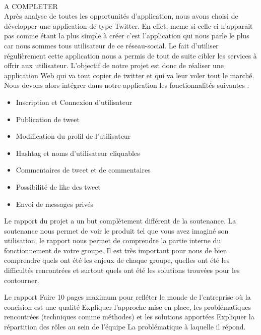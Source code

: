 \documentclass[a4paper, 12pt]{article}
\begin{document}
	\paragraph{}
	\large{A COMPLETER}\\
	    Après analyse de toutes les opportunités d'application, nous avons choisi de développer une application de type Twitter. En effet, meme si celle-ci n'apparait pas comme étant la plus simple à créer c'est l'application qui nous parle le plus car nous sommes tous utilisateur de ce réseau-social.
	    Le fait d'utiliser régulièrement cette application nous a permis de tout de suite cibler les services à offrir aux utilisateur.
		L'objectif de notre projet est donc de réaliser une application Web qui va tout copier de twitter et qui va leur voler tout le marché. Nous devons alors intégrer dans notre application les fonctionnalités suivantes : 
\begin{itemize}
\item Inscription et Connexion d'utilisateur
\item Publication de tweet 
\item Modification du profil de l'utilisateur
\item Hashtag et noms d'utilisateur cliquables
\item Commentaires de tweet et de commentaires
\item Possibilité de like des tweet
\item Envoi de messages privés
\end{itemize}
	



Le rapport du projet a un but complètement différent de la soutenance. La soutenance nous permet de voir le produit tel que vous avez imaginé son utilisation, le rapport nous permet de comprendre la partie interne du fonctionnement de votre groupe. Il est très important pour nous de bien comprendre quels ont été les enjeux de chaque groupe, quelles ont été les difficultés rencontrées et surtout quels ont été les solutions trouvées pour les contourner.


Le rapport
Faire 10 pages maximum pour refléter le monde de l’entreprise où la concision est une qualité
Expliquer l’approche mise en place, les problématiques rencontrées (techniques comme méthodes) et les solutions apportées
Expliquer la répartition des rôles au sein de l’équipe
La problématique à laquelle il répond.
\end{document}
